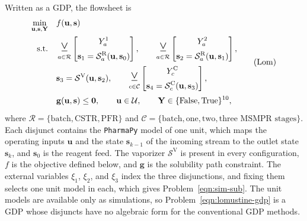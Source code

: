\documentclass{article}
\newcommand{\bigveebar}{%
  \mathop{\mathlarger{\mathlarger{\veebar}}}\displaylimits%
}
\begin{document}
Written as a GDP, the flowsheet is
\begin{equation}\label{eqn:lomustine-gdp}
\begin{aligned}
\min_{\mathbf u,\mathbf s,\mathbf Y}\quad & f(\mathbf u,\mathbf s)\\
\text{s.t.}\quad
&\bigveebar_{a\in\mathcal R}\left[\begin{gathered}Y^{1}_{a}\\ \mathbf s_1=\mathcal S^{\mathrm R}_{a}(\mathbf u,\mathbf s_0)\end{gathered}\right],\qquad
\bigveebar_{a\in\mathcal R}\left[\begin{gathered}Y^{2}_{a}\\ \mathbf s_2=\mathcal S^{\mathrm R}_{a}(\mathbf u,\mathbf s_1)\end{gathered}\right],\\
&\mathbf s_3=\mathcal S^{\mathrm V}(\mathbf u,\mathbf s_2),\qquad
\bigveebar_{c\in\mathcal C}\left[\begin{gathered}Y^{\mathrm C}_{c}\\ \mathbf s_4=\mathcal S^{\mathrm C}_{c}(\mathbf u,\mathbf s_3)\end{gathered}\right],\\
&\mathbf g(\mathbf u,\mathbf s)\leq\mathbf 0,\qquad \mathbf u\in\mathcal U,\qquad
\mathbf Y\in\{\mathrm{False},\mathrm{True}\}^{10},
\end{aligned}\tag{Lom}
\end{equation}
where \(\mathcal R=\{\text{batch},\text{CSTR},\text{PFR}\}\) and \(\mathcal C=\{\text{batch},\text{one},\text{two},\text{three MSMPR stages}\}\).
Each disjunct contains the \texttt{PharmaPy} model of one unit, which maps the operating inputs \(\mathbf u\) and the state \(\mathbf s_{k-1}\) of the incoming stream to the outlet state \(\mathbf s_k\), and \(\mathbf s_0\) is the reagent feed.
The vaporizer \(\mathcal S^{\mathrm V}\) is present in every configuration, \(f\) is the objective defined below, and \(\mathbf g\) is the solubility path constraint.
The external variables \(\xi_1\), \(\xi_2\), and \(\xi_3\) index the three disjunctions, and fixing them selects one unit model in each, which gives Problem~\eqref{eqn:sim-sub}.
The unit models are available only as simulations, so Problem~\eqref{eqn:lomustine-gdp} is a GDP whose disjuncts have no algebraic form for the conventional GDP methods.
\end{document}
